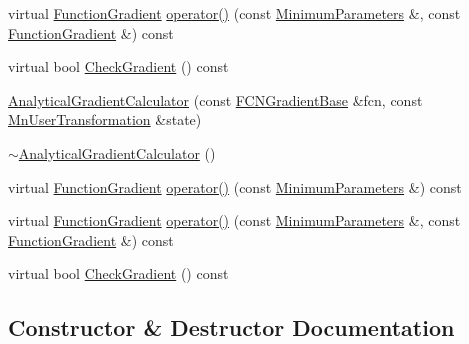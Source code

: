 \begin{DoxyCompactItemize}
\item 
virtual \mbox{\hyperlink{classROOT_1_1Minuit2_1_1FunctionGradient}{Function\+Gradient}} \mbox{\hyperlink{classROOT_1_1Minuit2_1_1AnalyticalGradientCalculator_a4048ce1c6e9b120f5cb808f090a90030}{operator()}} (const \mbox{\hyperlink{classROOT_1_1Minuit2_1_1MinimumParameters}{Minimum\+Parameters}} \&, const \mbox{\hyperlink{classROOT_1_1Minuit2_1_1FunctionGradient}{Function\+Gradient}} \&) const
\item 
virtual bool \mbox{\hyperlink{classROOT_1_1Minuit2_1_1AnalyticalGradientCalculator_aad6bcafd96845df588392bb7b255ece8}{Check\+Gradient}} () const
\item 
\mbox{\hyperlink{classROOT_1_1Minuit2_1_1AnalyticalGradientCalculator_a7cd3bd0ee00315f4e67cf4ad2a96790e}{Analytical\+Gradient\+Calculator}} (const \mbox{\hyperlink{classROOT_1_1Minuit2_1_1FCNGradientBase}{F\+C\+N\+Gradient\+Base}} \&fcn, const \mbox{\hyperlink{classROOT_1_1Minuit2_1_1MnUserTransformation}{Mn\+User\+Transformation}} \&state)
\item 
\mbox{\hyperlink{classROOT_1_1Minuit2_1_1AnalyticalGradientCalculator_a18d82365bea770691dae6f3b44d19ed4}{$\sim$\+Analytical\+Gradient\+Calculator}} ()
\item 
virtual \mbox{\hyperlink{classROOT_1_1Minuit2_1_1FunctionGradient}{Function\+Gradient}} \mbox{\hyperlink{classROOT_1_1Minuit2_1_1AnalyticalGradientCalculator_a711ef74b01726ca7081031998c44d81b}{operator()}} (const \mbox{\hyperlink{classROOT_1_1Minuit2_1_1MinimumParameters}{Minimum\+Parameters}} \&) const
\item 
virtual \mbox{\hyperlink{classROOT_1_1Minuit2_1_1FunctionGradient}{Function\+Gradient}} \mbox{\hyperlink{classROOT_1_1Minuit2_1_1AnalyticalGradientCalculator_a4048ce1c6e9b120f5cb808f090a90030}{operator()}} (const \mbox{\hyperlink{classROOT_1_1Minuit2_1_1MinimumParameters}{Minimum\+Parameters}} \&, const \mbox{\hyperlink{classROOT_1_1Minuit2_1_1FunctionGradient}{Function\+Gradient}} \&) const
\item 
virtual bool \mbox{\hyperlink{classROOT_1_1Minuit2_1_1AnalyticalGradientCalculator_aad6bcafd96845df588392bb7b255ece8}{Check\+Gradient}} () const
\end{DoxyCompactItemize}


\subsection{Constructor \& Destructor Documentation}
\mbox{\label{classROOT_1_1Minuit2_1_1AnalyticalGradientCalculator_a7cd3bd0ee00315f4e67cf4ad2a96790e}} 
